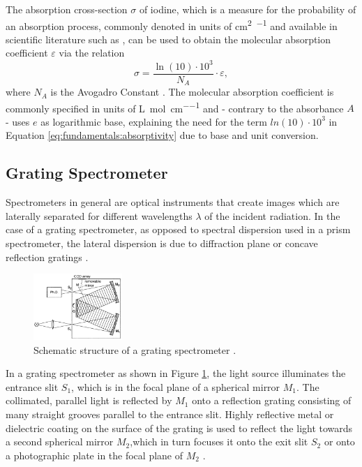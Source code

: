 The absorption cross-section $\sigma$ of iodine, which is a measure for the probability of an absorption process, commonly denoted in units of \si{\cm\squared\per\molecule} and available in scientific literature such as \cite{Iodine}, can be used to obtain the molecular absorption coefficient $\varepsilon$ via the relation
\begin{equation}
    \label{eq:fundamentals:absorptivity}
    \sigma = \frac{\ln(10) \cdot 10^3}{N_A} \cdot \varepsilon ,
\end{equation}
where $N_A$ is the Avogadro Constant \cite{attenuation}. The molecular absorption coefficient is commonly specified in units of \si{\liter\per\mol\per\cm} and - contrary to the absorbance $A$ - uses $e$ as logarithmic base, explaining the need for the term $ln(10) \cdot 10^3$ in Equation \ref{eq:fundamentals:absorptivity} due to base and unit conversion.


\subsection{Grating Spectrometer}

Spectrometers in general are optical instruments that create images which are laterally separated for different wavelengths $\lambda$ of the incident radiation. In the case of a grating spectrometer, as opposed to spectral dispersion used in a prism spectrometer, the lateral dispersion is due to diffraction plane or concave reflection gratings \cite{demtroder2014laser}.
\begin{figure}
    \centering
    \includegraphics[width=0.3\textwidth]{graphics/spectrometer.png}
    
    \caption[width = 0.1\textwidth]{Schematic structure of a grating spectrometer \cite{demtroder2014laser}.}
    \label{fig:fundamentals:spectrometer}
\end{figure}
In a grating spectrometer as shown in Figure \ref{fig:fundamentals:spectrometer}, the light source illuminates the entrance slit $S_1$, which is in the focal plane of a spherical mirror $M_1$. The collimated, parallel light is reflected by $M_1$ onto a reflection grating consisting of many straight grooves parallel to the entrance slit. Highly reflective metal or dielectric coating on the surface of the grating is used to reflect the light towards a second spherical mirror $M_2$,which in turn focuses it onto the exit slit $S_2$ or onto a photographic plate in the focal plane of $M_2$ \cite{demtroder2014laser}.

